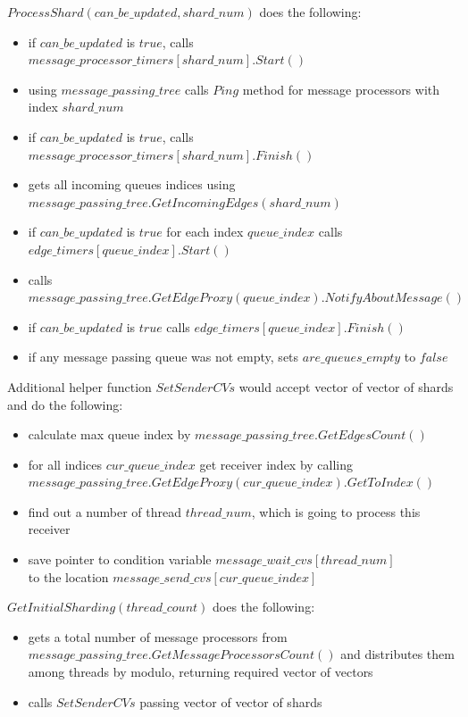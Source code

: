 \documentclass{article}
\begin{document}
$ProcessShard(can\_be\_updated, shard\_num)$ does the following:
\nopagebreak
\begin{itemize}
	\item if $can\_be\_updated$ is $true$, calls $message\_processor\_timers[shard\_num].Start()$
	\item using $message\_passing\_tree$ calls $Ping$ method for message processors with index $shard\_num$
	\item if $can\_be\_updated$ is $true$, calls $message\_processor\_timers[shard\_num].Finish()$
	\item gets all incoming queues indices using \\
		$message\_passing\_tree.GetIncomingEdges(shard\_num)$
	\item if $can\_be\_updated$ is $true$ for each index $queue\_index$ calls \\
		$edge\_timers[queue\_index].Start()$
	\item calls $message\_passing\_tree.GetEdgeProxy(queue\_index).NotifyAboutMessage()$
	\item if $can\_be\_updated$ is $true$ calls $edge\_timers[queue\_index].Finish()$
	\item if any message passing queue was not empty, sets $are\_queues\_empty$ to $false$
\end{itemize}

Additional helper function $SetSenderCVs$ would accept vector of vector of shards and do the following:
\begin{itemize}
	\item calculate max queue index by $message\_passing\_tree.GetEdgesCount()$
	\item for all indices $cur\_queue\_index$ get receiver index by calling\\
		$message\_passing\_tree.GetEdgeProxy(cur\_queue\_index).GetToIndex()$
	\item find out a number of thread $thread\_num$, which is going to process this receiver
	\item save pointer to condition variable $message\_wait\_cvs[thread\_num]$ \\ to the location $message\_send\_cvs[cur\_queue\_index]$
\end{itemize}

$GetInitialSharding(thread\_count)$ does the following:
\begin{itemize}
	\item gets a total number of message processors from \\
		$message\_passing\_tree.GetMessageProcessorsCount()$ and distributes them among threads by modulo, returning required vector of vectors
	\item calls $SetSenderCVs$ passing vector of vector of shards
\end{itemize}
\end{document}

